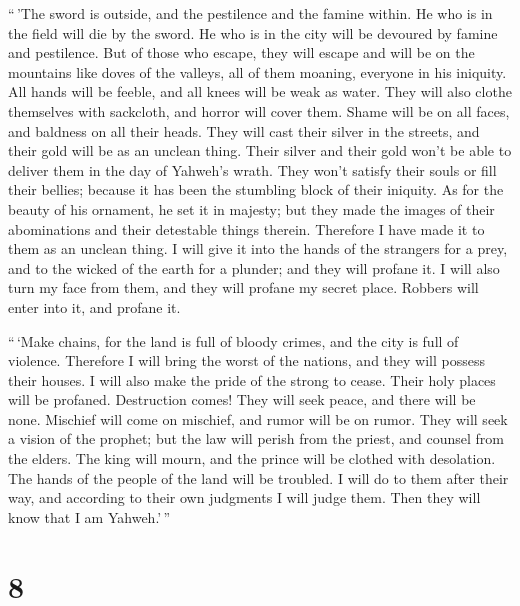  ``\,'The sword is outside, and the pestilence and the
famine within. He who is in the field will die by the sword. He who is
in the city will be devoured by famine and pestilence. 
But of those who escape, they will escape and will be on the mountains
like doves of the valleys, all of them moaning, everyone in his
iniquity.  All hands will be feeble, and all knees will
be weak as water.  They will also clothe themselves with
sackcloth, and horror will cover them. Shame will be on all faces, and
baldness on all their heads.  They will cast their silver
in the streets, and their gold will be as an unclean thing. Their silver
and their gold won't be able to deliver them in the day of Yahweh's
wrath. They won't satisfy their souls or fill their bellies; because it
has been the stumbling block of their iniquity.  As for
the beauty of his ornament, he set it in majesty; but they made the
images of their abominations and their detestable things therein.
Therefore I have made it to them as an unclean thing.  I
will give it into the hands of the strangers for a prey, and to the
wicked of the earth for a plunder; and they will profane it.
 I will also turn my face from them, and they will
profane my secret place. Robbers will enter into it, and profane it.

 ``\,`Make chains, for the land is full of bloody crimes,
and the city is full of violence.  Therefore I will bring
the worst of the nations, and they will possess their houses. I will
also make the pride of the strong to cease. Their holy places will be
profaned.  Destruction comes! They will seek peace, and
there will be none.  Mischief will come on mischief, and
rumor will be on rumor. They will seek a vision of the prophet; but the
law will perish from the priest, and counsel from the elders.
 The king will mourn, and the prince will be clothed with
desolation. The hands of the people of the land will be troubled. I will
do to them after their way, and according to their own judgments I will
judge them. Then they will know that I am Yahweh.'\,''

\hypertarget{section-6}{%
\section{8}\label{section-6}}


